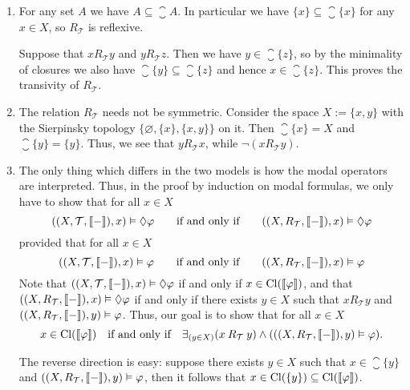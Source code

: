 \documentclass{article}
\newcommand{\topology}{{\mathcal{T}}}
\begin{document}
\begin{ex}
\begin{enumerate}
\item For any set $A$ we have $A\subseteq\closure{A}$. In particular we have
$\{x\}\subseteq\closure{\{x\}}$ for any $x\in X$, so $R_\topology$ is reflexive.

Suppose that $x\mathbin{R_\topology} y$ and $y\mathbin{R_\topology} z$. Then
we have $y\in\closure{\{z\}}$, so by the minimality of closures we also have
$\closure{\{y\}}\subseteq\closure{\{z\}}$ and hence $x\in\closure{\{z\}}$. This
proves the transivity of $R_\topology$.
\item The relation $R_\topology$ needs not be symmetric. Consider the space
$X:=\{x,y\}$ with the Sierpinsky topology $\{\varnothing,\{x\},\{x,y\}\}$ on it.
Then $\closure{\{x\}}=X$ and $\closure{\{y\}}=\{y\}$. Thus, we see that
$y\mathbin{R_\topology} x$, while $\neg(x\mathbin{R_\topology}y)$. 
\item The only thing which differs in the two models is how the modal operators
are interpreted. Thus, in the proof by induction on modal formulas, 
we only have to show that for all $x\in X$
\begin{equation*}
((X,\topology,\lsem{-}\rsem),x)\models\pos\varphi
  \qquad
  \text{if and only if}
  \qquad
((X,R_\topology,\lsem{-}\rsem),x)\models\pos\varphi
\end{equation*}
provided that for all $x\in X$
\begin{equation*}
((X,\topology,\lsem{-}\rsem),x)\models\varphi
  \qquad
  \text{if and only if}
  \qquad
((X,R_\topology,\lsem{-}\rsem),x)\models\varphi
\end{equation*}
Note that $((X,\topology,\lsem{-}\rsem),x)\models\pos\varphi$ if and only if
$x\in\mathrm{Cl}(\llbracket\varphi\rrbracket)$, and that
$((X,R_\topology,\lsem{-}\rsem),x)\models\pos\varphi$ if and only if
there exists $y\in X$ such that $x\mathbin{R_\topology}y$ and
$((X,R_\topology,\lsem{-}\rsem),y)\models\varphi$. Thus, our goal is to show
that for all $x\in X$
\begin{equation*}
x\in\closure{\lsem\varphi\rsem}
  \quad
  \text{if and only if}
  \quad
\exists_{(y\in X)}(x\mathbin{R_\topology}y)\land (((X,R_\topology,\lsem{-}\rsem),y)\models\varphi).
\end{equation*}

The reverse direction is easy: suppose there exists $y\in X$ such that
$x\in\closure{\{y\}}$ and $((X,R_\topology,\lsem{-}\rsem),y)\models\varphi$,
then it follows that $x\in\mathrm{Cl}(\{y\})\subseteq\mathrm{Cl}(\llbracket\varphi\rrbracket)$.


\end{enumerate}
\end{ex}
\end{document}
